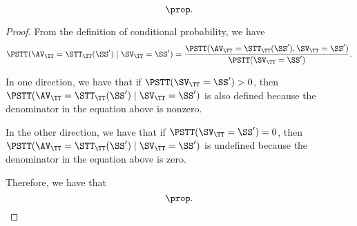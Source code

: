 \begin{proposition}
  $$\prop.$$%
\end{proposition}

\begin{proof}
  From the definition of conditional probability, we have
  $$ 
  \PSTT(\AV_\TT = \STT_\TT(\SS') \mid \SV_\TT = \SS')
  = 
  \frac
  {\PSTT(\AV_\TT = \STT_\TT(\SS'), \SV_\TT = \SS')}
  {\PSTT(\SV_\TT = \SS')}.$$

  In one direction, we have that if $\PSTT(\SV_\TT = \SS') > 0$, then 
  $ \PSTT(\AV_\TT = \STT_\TT(\SS') \mid \SV_\TT = \SS') $
  is also defined because the denominator in the equation above is nonzero.

  In the other direction, we have that if $\PSTT(\SV_\TT = \SS') = 0$, then 
  $ \PSTT(\AV_\TT = \STT_\TT(\SS') \mid \SV_\TT = \SS') $
  is undefined because the denominator in the equation above is zero.

  Therefore, we have that
  $$\prop.$$%
\end{proof}
